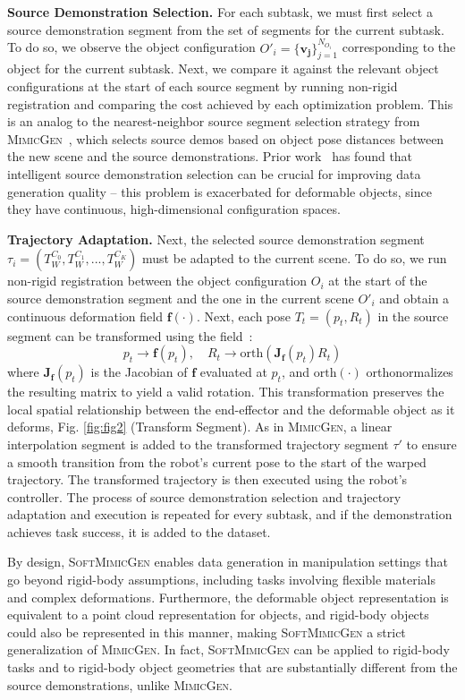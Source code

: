 \documentclass[letterpaper, 10 pt, conference]{ieeeconf}  %
\newcommand{\sysName}{\textsc{SoftMimicGen}\xspace}
\newcommand{\MimicGen}{\textsc{MimicGen}\xspace}
\begin{document}
\textbf{Source Demonstration Selection.}
For each subtask, we must first select a source demonstration segment from the set of segments for the current subtask. To do so, we observe the object configuration $O'_i = \{\mathbf{v_j}\}_{j=1}^{N_{O_{i}}}$ corresponding to the object for the current subtask. Next, we compare it against the relevant object configurations at the start of each source segment by running non-rigid registration and comparing the cost achieved by each optimization problem. This is an analog to the nearest-neighbor source segment selection strategy from \MimicGen~\cite{mandlekar2023mimicgen}, which selects source demos based on object pose distances between the new scene and the source demonstrations. Prior work~\cite{mandlekar2023mimicgen, robocasa2024} has found that intelligent source demonstration selection can be crucial for improving data generation quality -- this problem is exacerbated for deformable objects, since they have continuous, high-dimensional configuration spaces.


\textbf{Trajectory Adaptation.}
Next, the selected source demonstration segment $\tau_i = (T^{C_0}_W, T^{C_1}_W, ..., T^{C_K}_W)$ must be adapted to the current scene. To do so, we run non-rigid registration between the object configuration $O_i$ at the start of the source demonstration segment and the one in the current scene $O'_i$ and obtain a continuous deformation field $\mathbf{f(\cdot)}$. Next, each pose $T_t = (p_t, R_t)$ in the source segment can be transformed using the field~\cite{schulman2016learning}:
\[
p_t \rightarrow \mathbf{f}(p_t), \quad R_t \rightarrow \mathrm{orth}(\mathbf{J_f}(p_t) R_t)
\]
where $\mathbf{J_f}(p_t)$ is the Jacobian of $\mathbf{f}$ evaluated at $p_t$, and $\mathrm{orth}(\cdot)$ orthonormalizes the resulting matrix to yield a valid rotation. This transformation preserves the local spatial relationship between the end-effector and the deformable object as it deforms, Fig. \ref{fig:fig2} (Transform Segment). As in \MimicGen, a linear interpolation segment is added to the transformed trajectory segment $\tau'$ to ensure a smooth transition from the robot’s current pose to the start of the warped trajectory. The transformed trajectory is then executed using the robot’s controller. The process of source demonstration selection and trajectory adaptation and execution is repeated for every subtask, and if the demonstration achieves task success, it is added to the dataset.


By design, \sysName enables data generation in manipulation settings that go beyond rigid-body assumptions, including tasks involving flexible materials and complex deformations. Furthermore, the deformable object representation is equivalent to a point cloud representation for objects, and rigid-body objects could also be represented in this manner, making \sysName a strict generalization of \MimicGen. In fact, \sysName can be applied to rigid-body tasks and to rigid-body object geometries that are substantially different from the source demonstrations, unlike \MimicGen.
\end{document}
